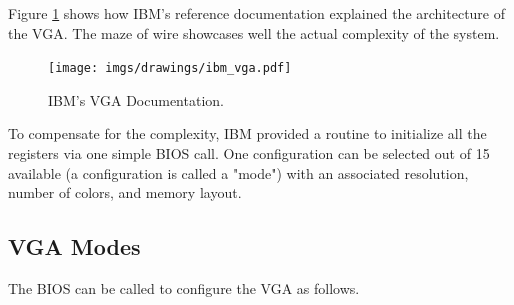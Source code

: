 \documentclass[book.tex]{subfiles}
\begin{document}
 Figure \ref{fig:ibm_vga} shows how IBM's reference documentation explained the architecture of the VGA. The maze of wire showcases well the actual complexity of the system.\\
 \begin{figure}[H]
\centering
\texttt{[image: imgs/drawings/ibm\_vga.pdf]}
\caption{IBM's VGA Documentation.}
\label{fig:ibm_vga}
\end{figure}

\bigskip



To compensate for the complexity, IBM provided a routine to initialize all the registers via one simple BIOS call. One configuration can be selected out of 15 available (a configuration is called a "mode") with an associated resolution, number of colors, and memory layout.\pagebreak

\subsection{VGA Modes}

The BIOS can be called to configure the VGA as follows.
\end{document}
